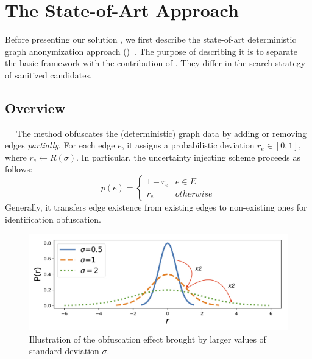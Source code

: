 \section{The State-of-Art Approach}
\label{sec:soa}
Before presenting our solution {\methodName}, we first describe the state-of-art deterministic graph anonymization approach ({\soaName})~\cite{Boldi_Injecting_2012}.
The purpose of describing it is to separate the basic framework with the contribution of {\methodName}. 
They differ in the search strategy of sanitized candidates.  

\subsection{Overview}~~
The {\soaName} method obfuscates the (deterministic) graph data by adding or removing edges \emph{partially}. 
For each edge $e$, it assigns a probabilistic deviation $r_{e} \in [0,1]$, where $r_{e} \leftarrow R(\sigma)$. 
In particular, the uncertainty injecting scheme proceeds as follows:
\begin{equation}
    p(e) =
    \begin{cases}
         1-r_{e}  & e \in E \\
         r_{e}    & otherwise 
    \end{cases}
    \label{eq:inject}
\end{equation}
Generally, it transfers edge existence from existing edges to non-existing ones for identification obfuscation.   

\begin{figure}[htb]
  \centering
        \includegraphics[width=0.8\linewidth]{figure/std_2.jpg}
  \vspace{-5pt}
  \caption{Illustration of the obfuscation effect brought by larger values of standard deviation $\sigma$.}
  \vspace{-5pt}
  \label{fig:std}
\end{figure} 

